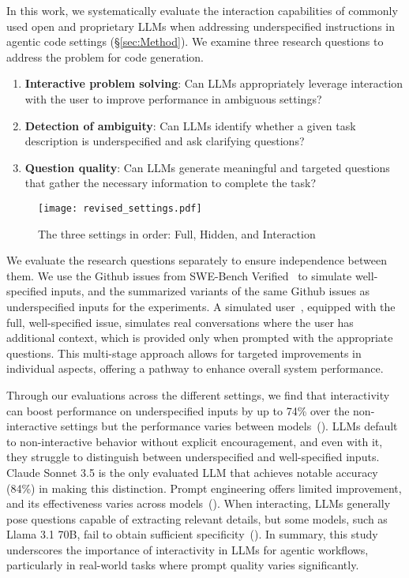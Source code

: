 In this work, we systematically evaluate the interaction capabilities of commonly used open and proprietary LLMs when addressing underspecified instructions in agentic code settings (\S\ref{sec:Method}). We examine three research questions to address the problem for code generation.
\begin{enumerate}[itemsep=0pt, topsep=0pt]
    \item \textbf{Interactive problem solving}: Can LLMs appropriately leverage interaction with the user to improve performance in ambiguous settings?
    \item \textbf{Detection of ambiguity}: Can LLMs identify whether a given task description is underspecified and ask clarifying questions?
    \item \textbf{Question quality}: Can LLMs generate meaningful and targeted questions that gather the necessary information to complete the task?
\end{enumerate}
\begin{figure*}[!t]
    \centering
    \texttt{[image: revised\_settings.pdf]}
    \vspace{-20pt}
    \caption{The three settings in order: Full, Hidden, and Interaction}
    \label{fig:settings}
    \vspace{-12pt}
\end{figure*}
We evaluate the research questions separately to ensure independence between them. We use the Github issues from SWE-Bench Verified~\cite{SWE_Bench_Verified} to simulate well-specified inputs, and the summarized variants of the same Github issues as underspecified inputs for the experiments. A simulated user~\cite{xu2024theagentcompanybenchmarkingllmagents, zhou2024sotopiainteractiveevaluationsocial}, equipped with the full, well-specified issue, simulates real conversations where the user has additional context, which is provided only when prompted with the appropriate questions. This multi-stage approach allows for targeted improvements in individual aspects, offering a pathway to enhance overall system performance.


 Through our evaluations across the different settings, we find that interactivity can boost performance on underspecified inputs by up to 74\% over the non-interactive settings but the performance varies between models~(). LLMs default to non-interactive behavior without explicit encouragement, and even with it, they struggle to distinguish between underspecified and well-specified inputs. Claude Sonnet 3.5 is the only evaluated LLM that achieves notable accuracy (84\%) in making this distinction. Prompt engineering offers limited improvement, and its effectiveness varies across models~(). When interacting, LLMs generally pose questions capable of extracting relevant details, but some models, such as Llama 3.1 70B, fail to obtain sufficient specificity~(). In summary, this study underscores the importance of interactivity in LLMs for agentic workflows, particularly in real-world tasks where prompt quality varies significantly.

\vspace{-10pt}